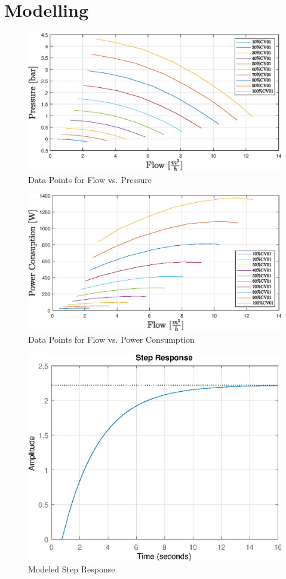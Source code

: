 \chapter{Modelling}
\label{app:modelling}
\begin{figure}[H]
	\centering
	\includegraphics[width=1\textwidth]{figures/05mathematicalModelling/flowVsPressureRun34.eps}
	\caption{Data Points for Flow vs. Pressure}
\end{figure}
\begin{figure}[H]
	\centering
	\includegraphics[width=1\textwidth]{figures/05mathematicalModelling/flowVsPowerRun34.eps}
	\caption{Data Points for Flow vs. Power Consumption}
\end{figure}
\begin{figure}[H]
	\centering
	\includegraphics[width=\textwidth]{figures/06ModelValidation/modeledStepResponse.eps}
	\caption{Modeled Step Response}
\end{figure}
